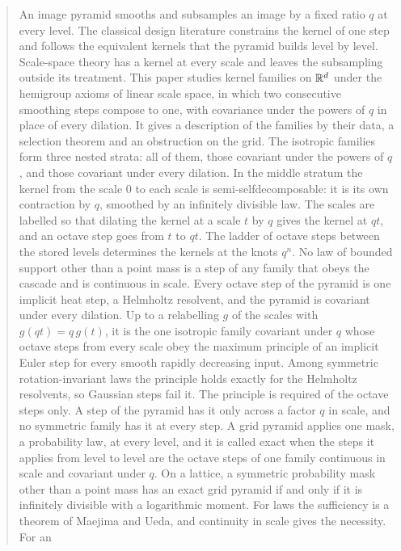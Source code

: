 \begin{abstract}
An image pyramid smooths and subsamples an image by a fixed ratio $q$ at every level. The classical
design literature constrains the kernel of one step and follows the equivalent kernels that the
pyramid builds level by level. Scale-space theory has a kernel at every scale and leaves the
subsampling outside its treatment. This paper studies kernel
families on $\RR^d$ under the hemigroup axioms of linear scale space, in which two consecutive
smoothing steps compose to one, with covariance under the powers of $q$ in place of every dilation.
It gives a description of the families by their \Levy{} data, a selection theorem and an
obstruction on the grid. The isotropic
families form three nested strata: all of them, those covariant under the powers of $q$, and those
covariant under every dilation. In the middle stratum the kernel from the scale $0$ to each scale
is semi-selfdecomposable: it is its own contraction by $q$, smoothed by an infinitely divisible law.
The scales are labelled so that
dilating the kernel at a scale $t$ by $q$ gives the kernel at $qt$, and an octave step goes from $t$ to $qt$. The ladder of octave steps between the stored levels determines the kernels at
the knots $q^n$. No law of bounded support other than a point mass is a step of any family that obeys
the cascade and is continuous in scale. Every octave step of the \Matern{} pyramid is one implicit
heat step, a Helmholtz resolvent, and the pyramid is covariant under every dilation. Up to a
relabelling $g$ of the scales with $g(qt) = q\,g(t)$, it is
the one isotropic family covariant under $q$ whose octave steps from every scale obey the maximum
principle of an implicit Euler step for every smooth rapidly decreasing input. Among symmetric
rotation-invariant laws the principle holds exactly for the Helmholtz resolvents, so Gaussian steps
fail it. The principle is required of the octave steps only. A step of the \Matern{} pyramid has it
only across a factor $q$ in scale, and no symmetric family has it at every step. A grid pyramid
applies one mask, a probability law, at every level, and it is called exact when the steps it
applies from level to level are the octave steps of one family continuous in scale and covariant
under $q$. On a lattice, a symmetric probability mask other than a point mass has an exact grid
pyramid if and only if it is infinitely divisible with a logarithmic moment. For laws the
sufficiency is a theorem of Maejima and Ueda, and continuity in scale gives the necessity. For an

\end{abstract}
